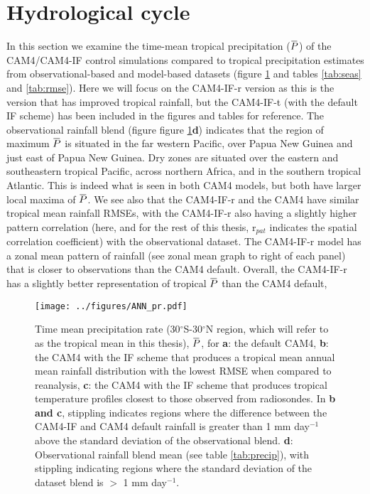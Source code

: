 \documentclass[letterpaper,12pt,titlepage,oneside,final]{book}
\newcommand{\overbar}[1]{\mkern 1.5mu\overline{\mkern-1.5mu#1\mkern-1.5mu}\mkern 1.5mu}
\begin{document}
\section{Hydrological cycle}

In this section we examine the time-mean tropical precipitation ($\overbar{P}$) of the CAM4/CAM4-IF control simulations compared to tropical precipitation estimates from observational-based and model-based datasets (figure \ref{fig:P} and tables \ref{tab:seas} and \ref{tab:rmse}). Here we will focus on the CAM4-IF-r version as this is the version that has improved tropical rainfall, but the CAM4-IF-t (with the default IF scheme) has been included in the figures and tables for reference. The observational rainfall blend (figure figure \ref{fig:P}\textbf{d})  indicates that the region of maximum $\overbar{P}$ is situated in the far western Pacific, over Papua New Guinea and just east of Papua New Guinea. Dry zones are situated over the eastern and southeastern tropical Pacific, across northern Africa, and in the southern tropical Atlantic. This is indeed what is seen in both CAM4 models, but both have larger local maxima of $\overbar{P}$. We see also that the CAM4-IF-r and the CAM4 have similar tropical mean rainfall RMSEs, with the CAM4-IF-r also having a slightly higher pattern correlation (here, and for the rest of this thesis, r$_{pat}$ indicates the spatial correlation coefficient) with the observational dataset. The CAM4-IF-r model has a  zonal mean pattern of rainfall (see zonal mean graph to right of each panel) that is closer to observations than the CAM4 default. Overall, the CAM4-IF-r has a slightly better representation of tropical $\overbar{P}$ than the CAM4 default,


\begin{figure}[H]
\centering
\noindent\texttt{[image: ../figures/ANN\_pr.pdf]}\hfill
\caption{\footnotesize Time mean precipitation rate (30$^\circ$S-30$^\circ$N region, which will refer to as the tropical mean in this thesis), $\overbar{P}$, for \textbf{a}: the default CAM4, \textbf{b}: the CAM4 with the IF scheme that produces a tropical mean annual mean rainfall distribution with the lowest RMSE when compared to reanalysis, \textbf{c}: the CAM4 with the IF scheme that produces tropical temperature profiles closest to those observed from radiosondes. In \textbf{b and c}, stippling indicates regions where the difference between the CAM4-IF and CAM4 default rainfall is greater than 1 mm day$^{-1}$ above the standard deviation of the observational blend. \textbf{d}: Observational rainfall blend mean (see table \ref{tab:precip}), with stippling indicating regions where the standard deviation of the dataset blend is $>$ 1 mm day$^{-1}$.}
\label{fig:P}
\end{figure}
\end{document}

